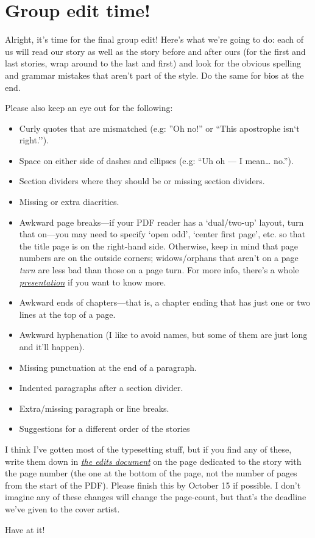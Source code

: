 \documentclass{memoir}
\begin{document}
\section*{Group edit time!}

Alright, it's time for the final group edit! Here's what we're going to do: each of us will read our story as well as the story before and after ours (for the first and last stories, wrap around to the last and first) and look for the obvious spelling and grammar mistakes that aren't part of the style. Do the same for bios at the end.

Please also keep an eye out for the following:

\begin{itemize}
  \item Curly quotes that are mismatched (e.g: ''Oh no!'' or ``This apostrophe isn`t right.'').
  \item Space on either side of dashes and ellipses (e.g: ``Uh oh --- I mean\ldots{} no.'').
  \item Section dividers where they should be or missing section dividers.
  \item Missing or extra diacritics.
\item Awkward page breaks---if your PDF reader has a `dual/two-up' layout, turn that on---you may need to specify `open odd', `center first page', etc. so that the title page is on the right-hand side. Otherwise, keep in mind that page numbers are on the outside corners; widows/orphans that aren't on a page \emph{turn} are less bad than those on a page turn. For more info, there's a whole \emph{\href{https://writing.drab-makyo.com/layout-and-design/}{presentation}} if you want to know more.
  \item Awkward ends of chapters---that is, a chapter ending that has just one or two lines at the top of a page.
  \item Awkward hyphenation (I like to avoid names, but some of them are just long and it'll happen).
  \item Missing punctuation at the end of a paragraph.
  \item Indented paragraphs after a section divider.
  \item Extra/missing paragraph or line breaks.
  \item Suggestions for a different order of the stories
\end{itemize}

I think I've gotten most of the typesetting stuff, but if you find any of these, write them down in \emph{\href{https://docs.google.com/document/d/15Nxm2nm1xkqlmeFr-Nmw2E1KVGYrnD0w5vPffdfcRUU/edit}{the edits document}} on the page dedicated to the story with the page number (the one at the bottom of the page, not the number of pages from the start of the PDF). Please finish this by October 15 if possible. I don't imagine any of these changes will change the page-count, but that's the deadline we've given to the cover artist.

Have at it!
\end{document}
